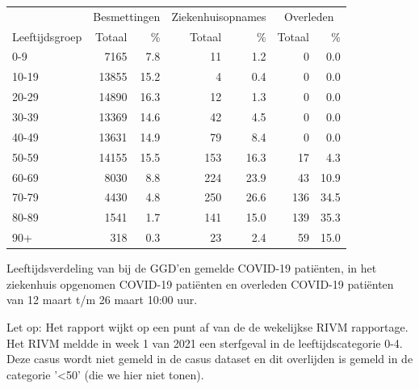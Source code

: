 \documentclass[
  english,
  man,floatsintext]{apa6}
\begin{document}
\begin{table}
\centering\begingroup\fontsize{11}{13}\selectfont

\begin{threeparttable}
\begin{tabular}{lrrrrrr}
\toprule
\multicolumn{1}{c}{ } & \multicolumn{2}{c}{Besmettingen} & \multicolumn{2}{c}{Ziekenhuisopnames} & \multicolumn{2}{c}{Overleden} \\
\cmidrule(l{3pt}r{3pt}){2-3} \cmidrule(l{3pt}r{3pt}){4-5} \cmidrule(l{3pt}r{3pt}){6-7}
Leeftijdsgroep & Totaal & \% & Totaal & \% & Totaal & \%\\
\midrule
0-9 & 7165 & 7.8 & 11 & 1.2 & 0 & 0.0\\
10-19 & 13855 & 15.2 & 4 & 0.4 & 0 & 0.0\\
20-29 & 14890 & 16.3 & 12 & 1.3 & 0 & 0.0\\
30-39 & 13369 & 14.6 & 42 & 4.5 & 0 & 0.0\\
40-49 & 13631 & 14.9 & 79 & 8.4 & 0 & 0.0\\
50-59 & 14155 & 15.5 & 153 & 16.3 & 17 & 4.3\\
60-69 & 8030 & 8.8 & 224 & 23.9 & 43 & 10.9\\
70-79 & 4430 & 4.8 & 250 & 26.6 & 136 & 34.5\\
80-89 & 1541 & 1.7 & 141 & 15.0 & 139 & 35.3\\
90+ & 318 & 0.3 & 23 & 2.4 & 59 & 15.0\\
\bottomrule
\end{tabular}
\begin{tablenotes}
\item[1] Leeftijdsverdeling van bij de GGD’en gemelde COVID-19 patiënten, in het ziekenhuis opgenomen COVID-19 patiënten en overleden COVID-19 patiënten van 12 maart t/m 26 maart 10:00 uur.
\item[2] Let op: Het rapport wijkt op een punt af van de de wekelijkse RIVM rapportage. Het RIVM meldde in week 1 van 2021 een sterfgeval in de leeftijdscategorie 0-4. Deze casus wordt niet gemeld in de casus dataset en dit overlijden is gemeld in de categorie '<50' (die we hier niet tonen).
\end{tablenotes}
\end{threeparttable}
\endgroup{}
\end{table}

\newpage
\end{document}
